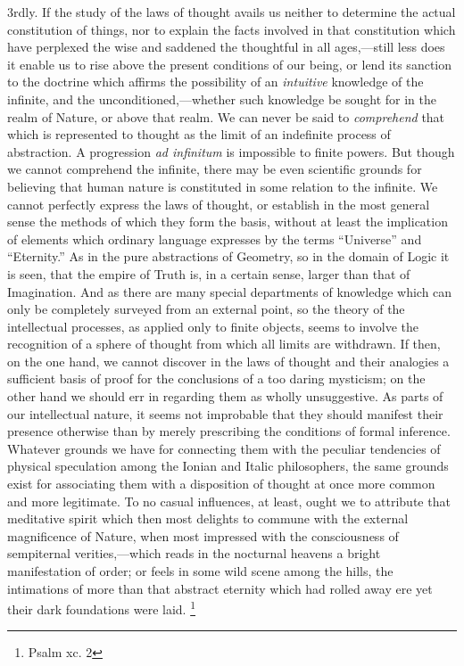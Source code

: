 \documentclass[oneside]{book}
\begin{document}
3rdly. If the study of the laws of thought avails us neither
to determine the actual constitution of things, nor to explain the
facts involved in that constitution which have perplexed the wise
and saddened the thoughtful in all ages,---still less does it enable
us to rise above the present conditions of our being, or lend its
sanction to the doctrine which affirms the possibility of an \emph{intuitive}
knowledge of the infinite, and the unconditioned,---whether
such knowledge be sought for in the realm of Nature, or
above that realm. We can never be said to \emph{comprehend} that
which is represented to thought as the limit of an indefinite
process of abstraction. A progression \textit{ad infinitum} is impossible
to finite powers. But though we cannot comprehend the
infinite, there may be even scientific grounds for believing that
human nature is constituted in some relation to the infinite. We
cannot perfectly express the laws of thought, or establish in the
most general sense the methods of which they form the basis, without
at least the implication of elements which ordinary language
expresses by the terms ``Universe'' and ``Eternity.'' As in the
pure abstractions of Geometry, so in the domain of Logic it is
seen, that the empire of Truth is, in a certain sense, larger than
that of Imagination. And as there are many special departments
of knowledge which can only be completely surveyed from an external
point, so the theory of the intellectual processes, as applied
only to finite objects, seems to involve the recognition of a
sphere of thought from which all limits are withdrawn. If then,
on the one hand, we cannot discover in the laws of thought and
their analogies a sufficient basis of proof for the conclusions of
a too daring mysticism; on the other hand we should err in regarding
them as wholly unsuggestive. As parts of our intellectual
nature, it seems not improbable that they should manifest
their presence otherwise than by merely prescribing the conditions
of formal inference. Whatever grounds we have for connecting
them with the peculiar tendencies of physical speculation
among the Ionian and Italic philosophers, the same grounds
exist for associating them with a disposition of thought at once
more common and more legitimate. To no casual influences, at
least, ought we to attribute that meditative spirit which then
most delights to commune with the external magnificence of
Nature, when most impressed with the consciousness of sempiternal
verities,---which reads in the nocturnal heavens a bright
manifestation of order; or feels in some wild scene among the
hills, the intimations of more than that abstract eternity which
had rolled away ere yet their dark foundations were laid.%
\footnote{Psalm xc. 2}
\end{document}
